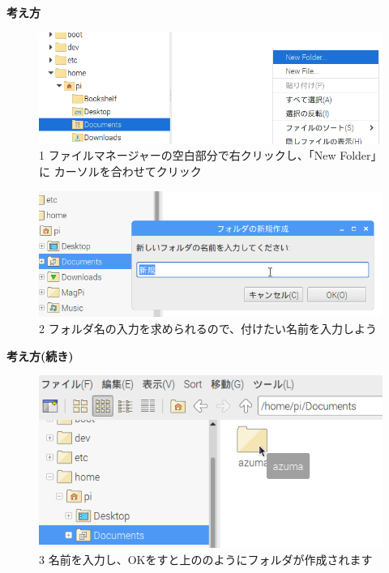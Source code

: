 \documentclass[a4paper,12pt]{jarticle}
\begin{document}
{\bf \large 考え方}
\begin{figure}[ht]
  \centering
  \begin{minipage}{0.9\textwidth}
    \includegraphics[width=\linewidth]{textbook-img034.png}
    \\1
    ファイルマネージャーの空白部分で右クリックし、「New Folder」に
    カーソルを合わせてクリック
     \vspace{60pt}
  \end{minipage}

  \centering
  \begin{minipage}{0.9\textwidth}
    \includegraphics[width=\linewidth]{textbook-img036.png}
    2
    フォルダ名の入力を求められるので、付けたい名前を入力しよう
  \end{minipage}
\end{figure}
\clearpage
{\bf\large 考え方(続き)}
\begin{figure}[hb]
  \centering
  \begin{minipage}{0.9\textwidth}
   \includegraphics[width=\linewidth]{textbook-img038.png}
    3
    名前を入力し、OKをすと上ののようにフォルダが作成されます
  \end{minipage}

\end{figure}
\end{document}
